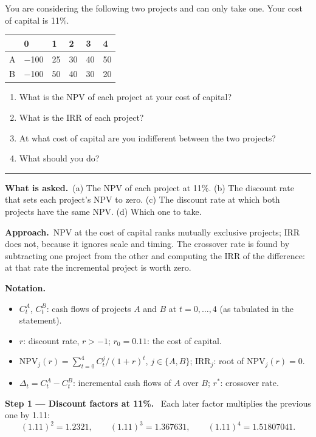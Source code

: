 \documentclass[11pt,a4paper]{article}
\numberwithin{equation}{section}
\newcommand{\step}[2]{\par\medskip\noindent\textbf{Step #1 --- #2.}~}
\newenvironment{notation}{\par\noindent\textbf{Notation.}\begin{itemize}[leftmargin=1.4em]}{\end{itemize}}
\newcommand{\asked}{\par\medskip\noindent\textbf{What is asked.}~}
\newcommand{\approach}{\par\smallskip\noindent\textbf{Approach.}~}
\newcommand{\stmtend}{\par\endgroup\nopagebreak\noindent\rule{\linewidth}{0.4pt}\par\medskip}
\begin{document}
You are considering the following two projects and can only take one. Your cost of capital is 11\%.

{\def\LTcaptype{none} %
\begin{longtable}[]{@{}llllll@{}}
\toprule\noalign{}
& 0 & 1 & 2 & 3 & 4 \\
\midrule\noalign{}
\endhead
\bottomrule\noalign{}
\endlastfoot
A & −100 & 25 & 30 & 40 & 50 \\
B & −100 & 50 & 40 & 30 & 20 \\
\end{longtable}
}

\begin{enumerate}
\def\labelenumi{\alph{enumi}.}
\item
  What is the NPV of each project at your cost of capital?
\item
  What is the IRR of each project?
\item
  At what cost of capital are you indifferent between the two projects?
\item
  What should you do?
\end{enumerate}
\stmtend

\asked (a) The NPV of each project at 11\%. (b) The discount rate that sets each project's NPV to
zero. (c) The discount rate at which both projects have the same NPV. (d) Which one to take.

\approach NPV at the cost of capital ranks mutually exclusive projects; IRR does not, because it
ignores scale and timing. The crossover rate is found by subtracting one project from the other
and computing the IRR of the difference: at that rate the incremental project is worth zero.

\begin{notation}
  \item $C^A_t$, $C^B_t$: cash flows of projects $A$ and $B$ at $t=0,\dots,4$ (as tabulated in the statement).
  \item $r$: discount rate, $r>-1$; $r_0=0.11$: the cost of capital.
  \item $\mathrm{NPV}_j(r)=\sum_{t=0}^{4} C^j_t/(1+r)^t$, $j\in\{A,B\}$; $\mathrm{IRR}_j$: root of $\mathrm{NPV}_j(r)=0$.
  \item $\Delta_t=C^A_t-C^B_t$: incremental cash flows of $A$ over $B$; $r^\ast$: crossover rate.
\end{notation}

\step{1}{Discount factors at 11\%} Each later factor multiplies the previous one by 1.11:
\begin{equation}\label{eq:7df}
  (1.11)^2 = 1.2321, \qquad (1.11)^3 = 1.367631, \qquad (1.11)^4 = 1.51807041.
\end{equation}
\end{document}
